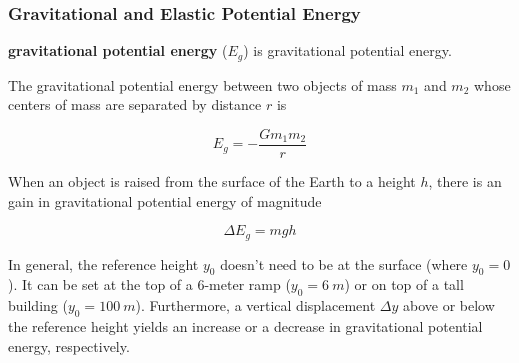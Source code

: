 \documentclass[dvipsnames]{article}
\begin{document}
\subsubsection{Gravitational and Elastic Potential Energy}

\textbf{\Gls{gravitational potential energy}} ($E_g$) is \glsdesc{gravitational potential energy}.

The gravitational potential energy between two objects of mass $m_1$ and $m_2$ whose centers of mass are separated by distance $r$ is

\begin{equation*}
    E_g = -\frac{G m_1 m_2}{r}
\end{equation*}

When an object is raised from the surface of the Earth to a height $h$, there is an gain in gravitational potential energy of magnitude

\begin{equation*}
    \Delta E_g = mgh
\end{equation*}

\begin{center}
\end{center}

In general, the reference height $y_0$ doesn't need to be at the surface (where $y_0 = 0$). It can be set at the top of a 6-meter ramp ($y_0 = \SI{6}{m}$) or on top of a tall building ($y_0 = \SI{100}{m}$). Furthermore, a vertical displacement $\Delta y$ above or below the reference height yields an increase or a decrease in gravitational potential energy, respectively. 
\end{document}
